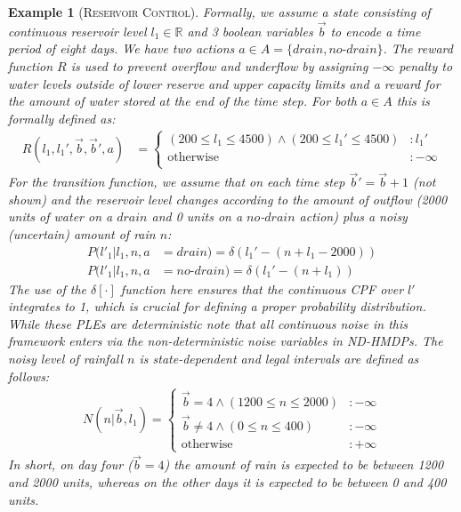 \documentclass[letterpaper]{article}
\newtheorem*{example*}{Example}
\begin{document}
\begin{example*}[\textsc{Reservoir Control}]
Formally, we assume a state consisting of continuous reservoir level $l_1 \in \mathbb{R}$
and 3 boolean variables $\vec{b}$ to encode a time period of eight days.  We have
two actions $a \in A = \{ \mathit{drain}, \mathit{no}\text{-}\mathit{drain} \}$.
The reward function $R$ is used to prevent overflow and underflow by assigning
$-\infty$ penalty to water levels outside of lower reserve and upper
capacity limits and a reward for the amount of water stored at the end of
the time step.  For both $a \in A$ this is formally defined as:
\vspace{-0mm} 
{\footnotesize
\begin{align}
R(l_1,l_1',\vec{b},\vec{b}',a) &= 
\begin{cases}
(200 \! \leq \! l_1 \! \leq \! 4500) \wedge (200 \! \leq \! l_1' \! \leq \! 4500) & \!\! : l_1'\\
\text{otherwise} & \!\! : -\infty\\
\end{cases} \label{eq:reward}
\end{align}
} 
For the transition function, we assume that on each time step
$\vec{b}' = \vec{b} + 1$ (not shown) and the reservoir level changes
according to the amount of outflow (2000 units of water on a
$\mathit{drain}$ and 0 units on a $\mathit{no}$-$\mathit{drain}$
action) plus a noisy (uncertain) amount of rain $n$: {\footnotesize
\begin{align}
P(l'_1|l_1,n, a& =\mathit{drain}) = \delta \left( l_1'  - (n + l_1 - 2000) \right) \label{eq:drain_trans} \\
P(l'_1|l_1,n, a&=\mathit{no}\text{-}\mathit{drain}) =\delta \left( l_1'  -  (n + l_1) \right) \label{eq:nodrain_trans}
\end{align}}
The use of the $\delta[\cdot]$ function here ensures that the continuous CPF over $l'$ integrates to 1,
which is crucial for defining a proper probability distribution.  While these PLEs are deterministic
note that all continuous noise in this framework enters via the non-deterministic noise variables
in ND-HMDPs.  The noisy level of rainfall $n$ is state-dependent and legal intervals are defined as follows:
{\footnotesize
\begin{align}
N(n|\vec{b},l_1) = \begin{cases}
\vec{b} = 4 \wedge (1200 \leq n \leq 2000) &: -\infty \\
\vec{b} \neq 4  \wedge (0 \leq n \leq 400)&: -\infty \\
\text{otherwise} &: +\infty
\end{cases} \label{eq:noise}
\end{align}}
In short, on day four ($\vec{b} = 4$) the amount of rain is expected to be between
1200 and 2000 units, whereas on the other days it is expected to be between 0 and 400 units.
\end{example*}
\end{document}
